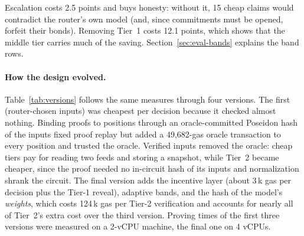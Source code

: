 \documentclass[sigconf,nonacm]{acmart}
\begin{document}
Escalation costs 2.5 points and buys honesty: without it, 15 cheap claims would contradict the router's own model (and, since commitments must be opened, forfeit their bonds). Removing Tier~1 costs 12.1 points, which shows that the middle tier carries much of the saving. Section~\ref{sec:eval-bands} explains the band rows.

\paragraph{How the design evolved.} Table~\ref{tab:versions} follows the same measures through four versions. The first (router-chosen inputs) was cheapest per decision because it checked almost nothing. Binding proofs to positions through an oracle-committed Poseidon hash of the inputs fixed proof replay but added a 49,682-gas oracle transaction to every position and trusted the oracle. Verified inputs removed the oracle: cheap tiers pay for reading two feeds and storing a snapshot, while Tier~2 became cheaper, since the proof needed no in-circuit hash of its inputs and normalization shrank the circuit. The final version adds the incentive layer (about 3\,k gas per decision plus the Tier-1 reveal), adaptive bands, and the hash of the model's \emph{weights}, which costs 124\,k gas per Tier-2 verification and accounts for nearly all of Tier~2's extra cost over the third version. Proving times of the first three versions were measured on a 2-vCPU machine, the final one on 4 vCPUs.
\end{document}
